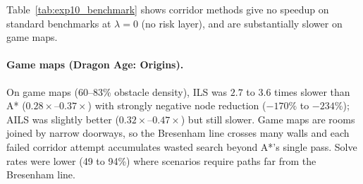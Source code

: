 \documentclass[11pt]{article}
\begin{document}
\begin{table}[!htbp]
\centering
\caption{ILS and AILS performance on Moving AI Lab benchmark maps ($\lambda = 0$, up to 100 scenarios per map). Speed = speedup vs.\ A*; Red = node reduction \%; Opt = path cost ratio vs.\ A*; Slv = solve rate.}
\label{tab:exp10_benchmark}
\end{table}

Table~\ref{tab:exp10_benchmark} shows corridor methods give no speedup on standard benchmarks at $\lambda = 0$ (no risk layer), and are substantially slower on game maps.

\paragraph{Game maps (Dragon Age: Origins).}
On game maps (60--83\% obstacle density), ILS was $2.7$ to $3.6$ times slower than A* ($0.28\times$--$0.37\times$) with strongly negative node reduction ($-170\%$ to $-234\%$); AILS was slightly better ($0.32\times$--$0.47\times$) but still slower. Game maps are rooms joined by narrow doorways, so the Bresenham line crosses many walls and each failed corridor attempt accumulates wasted search beyond A*'s single pass. Solve rates were lower (49 to 94\%) where scenarios require paths far from the Bresenham line.
\end{document}
